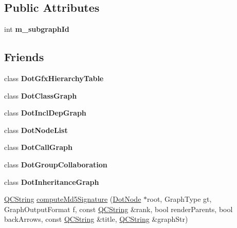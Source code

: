 \subsection*{Public Attributes}
\begin{DoxyCompactItemize}
\item 
\mbox{\label{class_dot_node_afa257c0a638d14c60ba4714df5a9845b}} 
int {\bfseries m\+\_\+subgraph\+Id}
\end{DoxyCompactItemize}
\subsection*{Friends}
\begin{DoxyCompactItemize}
\item 
\mbox{\label{class_dot_node_a17f4bf1cb76060fb23b5d2e4d49a578c}} 
class {\bfseries Dot\+Gfx\+Hierarchy\+Table}
\item 
\mbox{\label{class_dot_node_aa0285f25f08e09a51d2d402e2f7f697f}} 
class {\bfseries Dot\+Class\+Graph}
\item 
\mbox{\label{class_dot_node_af4dd0198d517a07b979a10cb13a77148}} 
class {\bfseries Dot\+Incl\+Dep\+Graph}
\item 
\mbox{\label{class_dot_node_a8782e47c20d8314fd3b24f1dc3fe081a}} 
class {\bfseries Dot\+Node\+List}
\item 
\mbox{\label{class_dot_node_a6dc1c2df4e772dc9740f210dc2a7e522}} 
class {\bfseries Dot\+Call\+Graph}
\item 
\mbox{\label{class_dot_node_a32f81573a55b09d3b8f7d8b7ce6b2fbf}} 
class {\bfseries Dot\+Group\+Collaboration}
\item 
\mbox{\label{class_dot_node_afe8663d3231ffb700d56ef6eedb99208}} 
class {\bfseries Dot\+Inheritance\+Graph}
\item 
\mbox{\hyperlink{class_q_c_string}{Q\+C\+String}} \mbox{\hyperlink{class_dot_node_a0cd029184c5ab8f66d35ddce33339550}{compute\+Md5\+Signature}} (\mbox{\hyperlink{class_dot_node}{Dot\+Node}} $\ast$root, Graph\+Type gt, Graph\+Output\+Format f, const \mbox{\hyperlink{class_q_c_string}{Q\+C\+String}} \&rank, bool render\+Parents, bool back\+Arrows, const \mbox{\hyperlink{class_q_c_string}{Q\+C\+String}} \&title, \mbox{\hyperlink{class_q_c_string}{Q\+C\+String}} \&graph\+Str)
\end{DoxyCompactItemize}


